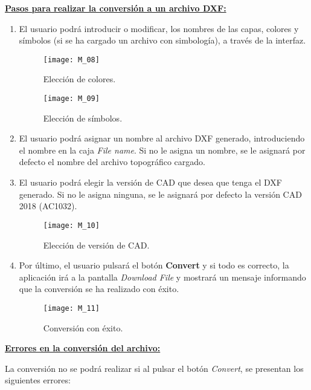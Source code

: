 \textbf{\underline{Pasos para realizar la conversión a un archivo DXF:} }

\begin{enumerate}


\item El usuario podrá introducir o modificar, los nombres de las capas, colores y símbolos (si se ha cargado un archivo con simbología), a través de la interfaz. 
\begin{figure}[H]
	\centering
	\texttt{[image: M\_08]}
	\caption{Elección de colores.}
	\label{fig:M_08}
\end{figure}

\begin{figure}[H]
	\centering
	\texttt{[image: M\_09]}
	\caption{Elección de símbolos.}
	\label{fig:M_09}
\end{figure}

\item El usuario podrá asignar un nombre al archivo DXF generado, introduciendo el nombre en la caja \emph{File name}. Si no le asigna un nombre, se le asignará por defecto el nombre del archivo topográfico cargado.


\item El usuario podrá elegir la versión de CAD que desea que tenga el DXF generado. Si no le asigna ninguna, se le asignará por defecto la versión CAD 2018 (AC1032).

\begin{figure}[H]
	\centering
	\texttt{[image: M\_10]}
	\caption{Elección de versión de CAD.}
	\label{fig:M_10}
\end{figure}

\item Por último, el usuario pulsará el botón \textbf{Convert} y si todo es correcto, la aplicación irá a la pantalla \emph{Download File} y mostrará un mensaje informando que la conversión se ha realizado con éxito.

\begin{figure}[H]
	\centering
	\texttt{[image: M\_11]}
	\caption{Conversión con éxito.}
	\label{fig:M_11}
\end{figure}

\end{enumerate} 

\textbf{\underline{Errores en la conversión del archivo:} } 

La conversión no se podrá realizar si al pulsar el botón \emph{Convert}, se presentan los siguientes errores:

